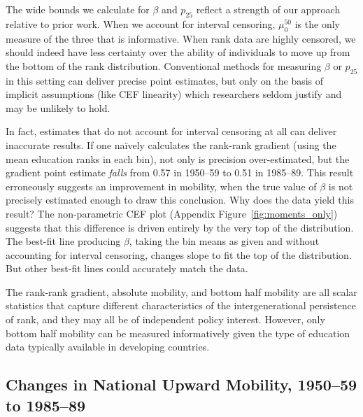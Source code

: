 \documentclass[12pt,letterpaper]{article}
\numberwithin{equation}{section}
\begin{document}
The wide bounds we calculate for $\beta$ and $p_{25}$ reflect a strength of our approach relative to prior work. When we account for interval censoring, $\mu_0^{50}$ is the only measure of the three that is informative. When rank data are highly censored, we should indeed have less certainty over the ability of individuals to move up from the bottom of the rank distribution. Conventional methods for measuring $\beta$ or $p_{25}$ in this setting can deliver precise point estimates, but only on the basis of implicit assumptions (like CEF linearity) which researchers seldom justify and may be unlikely to hold.

In fact, estimates that do not account for interval censoring at all can deliver inaccurate results. If one na\"{i}vely calculates the rank-rank gradient (using the mean education ranks in each bin), not only is precision over-estimated, but the gradient point estimate \textit{falls} from 0.57 in 1950--59 to 0.51 in 1985--89. This result erroneously suggests an improvement in mobility, when the true value of $\beta$ is not precisely estimated enough to draw this conclusion. Why does the data yield this result? The non-parametric CEF plot (Appendix Figure~\ref{fig:moments_only}) suggests that this difference is driven entirely by the very top of the distribution. The best-fit line producing $\beta$, taking the bin means as given and without accounting for interval censoring, changes slope to fit the top of the distribution. But other best-fit lines could accurately match the data. 

The rank-rank gradient, absolute mobility, and bottom half mobility are all scalar statistics that capture different characteristics of the intergenerational persistence of rank, and they may all be of independent policy interest. However, only bottom half mobility can be measured informatively given the type of education data typically available in developing countries. 

\subsection{Changes in National Upward Mobility, 1950--59 to 1985--89}
\label{sec:national}
\end{document}
